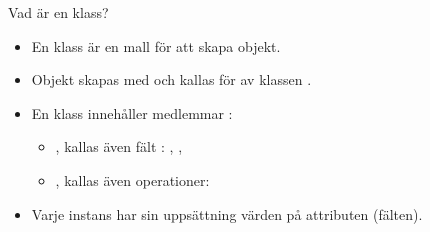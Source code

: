 



\begin{Slide}{Vad är en klass?}
\begin{itemize} 
\item En klass är en mall för att skapa objekt. 
\item Objekt skapas med  och kallas för   av klassen .
\item En klass innehåller medlemmar : 
  \begin{itemize} 
  \item {}, kallas även fält : , ,  
  \item {}, kallas även operationer: 
  \end{itemize}
\item Varje instans har sin uppsättning värden på attributen (fälten).
\end{itemize}

\end{Slide}


\ifkompendium\else



